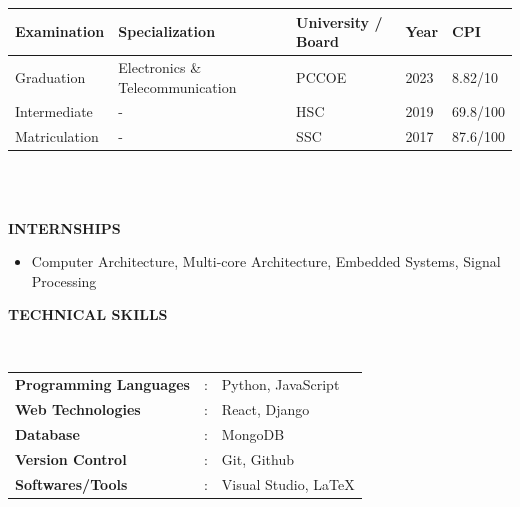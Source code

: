 \documentclass[a4paper,10pt]{article}
\begin{document}
\vspace{-.8cm}

\begin{tabularx}{.98\textwidth}{llp{2cm}lll}
  \hline
  \textbf{Examination} & \textbf{Specialization}          &  & \textbf{University / Board} & \textbf{Year} & \textbf{CPI} \\
  \hline
  Graduation           & Electronics \& Telecommunication &  & PCCOE                       & 2023          & 8.82/10      \\
  Intermediate         & -                                &  & HSC                         & 2019          & 69.8/100     \\
  Matriculation        & -                                &  & SSC                         & 2017          & 87.6/100     \\
  \hline
\end{tabularx}
\\\\


\colorbox{titleColor}{\parbox{6.7in}{\textbf{INTERNSHIPS}}}
\begin{itemize}
  \setlength{\itemsep}{1pt}
  \item {{Computer Architecture, Multi-core Architecture, Embedded Systems, Signal Processing}}
\end{itemize}

\colorbox{titleColor}{\parbox{6.7in}{\textbf{TECHNICAL SKILLS}}}\\

\begin{tabular}{p{1.6in}p{0.1in}p{4.5in}}
  \textbf{\small{Programming Languages}} & : & {{Python, JavaScript}}     \\
  \textbf{\small{Web Technologies}}      & : & {{React, Django}}          \\
  \textbf{\small{Database}}              & : & {{MongoDB}}                \\
  \textbf{\small{Version Control}}       & : & {{Git, Github}}            \\
  \textbf{\small{Softwares/Tools}}       & : & {{ Visual Studio, \LaTeX}} \\
\end{tabular}
\end{document}
